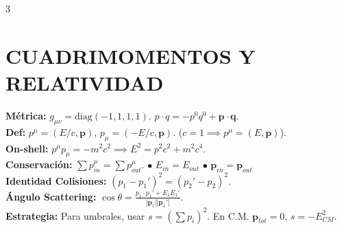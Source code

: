 \documentclass[8pt,a4paper,fleqn]{extarticle} %
\begin{document}
\begin{multicols}{3}
\section{CUADRIMOMENTOS Y RELATIVIDAD}
\textbf{Métrica:} $g_{\mu\nu} = \text{diag}(-1, 1, 1, 1)$. $p \cdot q = -p^0 q^0 + \mathbf{p} \cdot \mathbf{q}$.\\
\textbf{Def:} $p^\mu = (E/c, \mathbf{p})$, $p_\mu = (-E/c, \mathbf{p})$. ($c=1 \implies p^\mu = (E, \mathbf{p})$).\\
\textbf{On-shell:} $p^\mu p_\mu = -m^2 c^2 \implies E^2 = p^2c^2 + m^2c^4$.\\
\textbf{Conservación:} $\sum p_{in}^\mu = \sum p_{out}^\mu$.
$\bullet$ $E_{in} = E_{out}$  $\bullet$ $\mathbf{p}_{in} = \mathbf{p}_{out}$\\
\textbf{Identidad Colisiones:} $(p_1 - p_1')^2 = (p_2' - p_2)^2$.\\
\textbf{Ángulo Scattering:} $\cos \theta = \frac{p_1 \cdot p_1' + E_1 E_1'}{|\mathbf{p}_1||\mathbf{p}_1'|}$.\\
\textbf{Estrategia:} Para umbrales, usar $s = (\sum p_i)^2$. En C.M. $\mathbf{p}_{tot}=0$, $s = -E_{CM}^2$.



\end{multicols}
\end{document}
